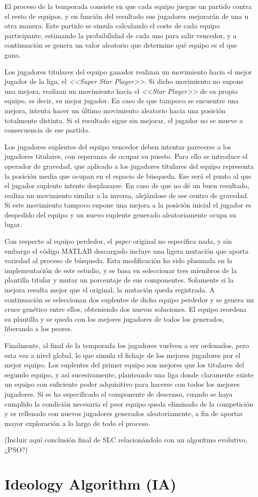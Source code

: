 El proceso de la temporada consiste en que cada equipo juegue un partido contra el resto de equipos, y en función del resultado sus jugadores mejorarán de una u otra manera. Este partido se simula calculando el coste de cada equipo participante, estimando la probabilidad de cada uno para salir vencedor, y a continuación se genera un valor aleatorio que determine qué equipo es el que gana.

Los jugadores titulares del equipo ganador realizan un movimiento hacia el mejor jugador de la liga, el \textit{<<Super Star Player>>}. Si dicho movimiento no supone una mejora, realizan un movimiento hacia el \textit{<<Star Player>>} de su propio equipo, es decir, su mejor jugador. En caso de que tampoco se encuentre una mejora, intenta hacer un último movimiento aleatorio hacia una posición totalmente distinta. Si el resultado sigue sin mejorar, el jugador no se mueve a consecuencia de ese partido.

Los jugadores suplentes del equipo vencedor deben intentar parecerse a los jugadores titulares, con esperanza de ocupar su puesto. Para ello se introduce el operador de gravedad, que aplicado a los jugadores titulares del equipo representa la posición media que ocupan en el espacio de búsqueda. Ese será el punto al que el jugador suplente intente desplazarse. En caso de que no dé un buen resultado, realiza un movimiento similar a la inversa, alejándose de ese centro de gravedad. Si este movimiento tampoco supone una mejora a la posición inicial el jugador es despedido del equipo y un nuevo suplente generado aleatoriamente ocupa su lugar.

Con respecto al equipo perdedor, el \textit{paper} original no especifica nada, y sin embargo el código MATLAB descargado \cite{slc-matlab} incluye una ligera mutación que aporta variedad al proceso de búsqueda. Esta modificación ha sido plasmada en la implementación de este estudio, y se basa en seleccionar tres miembros de la plantilla titular y mutar un porcentaje de sus componentes. Solamente si la mejora resulta mejor que el original, la mutación queda registrada. A continuación se seleccionan dos suplentes de dicho equipo perdedor y se genera un cruce genético entre ellos, obteniendo dos nuevas soluciones. El equipo reordena su plantilla y se queda con los mejores jugadores de todos los generados, liberando a los peores.

Finalmente, al final de la temporada los jugadores vuelven a ser ordenados, pero esta vez a nivel global, lo que simula el fichaje de los mejores jugadores por el mejor equipo. Los suplentes del primer equipo son mejores que los titulares del segundo equipo, y así sucesivamente, planteando una liga donde claramente existe un equipo con suficiente poder adquisitivo para hacerse con todos los mejores jugadores. Si se ha especificado el componente de descenso, cuando se haya cumplido la condición necesaria el peor equipo queda eliminado de la competición y es rellenado con nuevos jugadores generados aleatoriamente, a fin de aportar mayor exploración a lo largo de todo el proceso.

(Incluir aquí conclusión final de SLC relacionándolo con un algoritmo evolutivo, ¿PSO?)

\section{Ideology Algorithm (IA)}